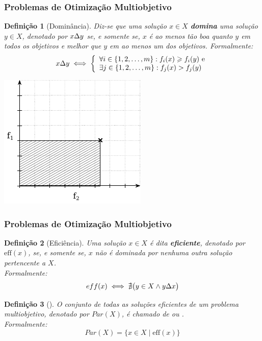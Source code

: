 \documentclass[10pt,xcolor=table,fleqn]{beamer}
\newtheorem{mydef}{Definição}
\renewcommand{\emph}{\textbf}
\begin{document}
\begin{frame}
  \frametitle{Problemas de Otimização Multiobjetivo}
  \begin{mydef}[Dominância]
  Diz-se que uma solução $x \in X$
  \emph{domina} uma solução $y \in X$, denotado por $x \Delta y$
  se, e somente se, $x$ é ao menos tão boa quanto
  $y$ em todos os objetivos e melhor que $y$ em ao menos um dos objetivos.
  \pause
  Formalmente:
  \begin{equation*}
      x \Delta y \iff \left\{
        \begin{array}{l}
            \forall i \in \{1, 2, \ldots, m\}: f_i(x) \geqslant f_i(y) ~\text{e}\\
            \exists j \in \{1, 2, \ldots, m\}: f_j(x) > f_j(y)
    \end{array} \right.
    \label{eq:dom}
  \end{equation*}
  \end{mydef}
  \pause
  \begin{center}
    \vspace*{-4mm}
    \includegraphics[scale=0.8]{../img/mokp/dom-def}
  \end{center}
\end{frame}

\begin{frame}
  \frametitle{Problemas de Otimização Multiobjetivo}
  \begin{mydef}[Eficiência]
    Uma solução $x \in X$ é dita \emph{eficiente}, denotado por $\text{eff}(x)$,
    se, e somente se, $x$ não é dominada por nenhuma outra solução pertencente a $X$.
    \\ \pause
    Formalmente:
    \begin{displaymath}
      eff(x) \iff \nexists \big(y \in X \wedge y \Delta x \big)
    \end{displaymath}
  \end{mydef}
  \pause
  \begin{mydef}[\paretoset{}]
    O conjunto de todas as soluções eficientes de um problema multiobjetivo,
    denotado por $Par(X)$, é chamado de \emph{\paretoset{}} ou \emph{\paretosetII{}}.
    \\ \pause
    Formalmente:
    \begin{displaymath}
      Par(X) = \{ x \in X \;|\; \text{eff}(x)\}
    \end{displaymath}
  \end{mydef}
\end{frame}
\end{document}

